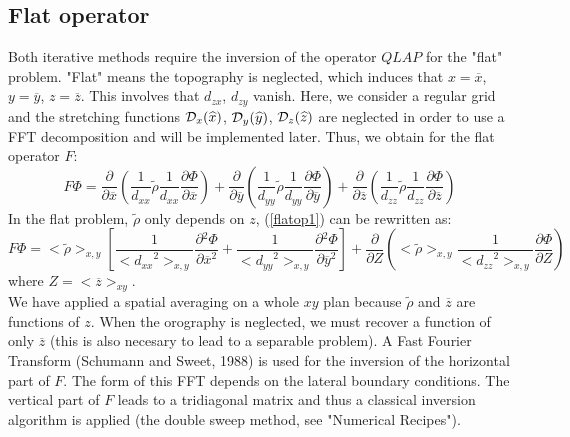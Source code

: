 \subsection{Flat operator}
\par Both iterative methods require the inversion of the operator $QLAP$ for
the "flat" problem. "Flat" means the topography is neglected, which induces
that $x=\overline{x}$, $y=\overline{y}$, $z=\overline{z}$.
This involves that $d_{zx}$, $d_{zy}$ vanish. Here, we consider a regular grid
and the stretching functions ${\cal{D}}_x (\widehat{x})$,
${\cal{D}}_y (\widehat{y})$, ${\cal{D}}_z (\widehat{z})$ are neglected
in order to use a FFT decomposition and will be implemented later. Thus, we
obtain for the flat operator $F$:\\
\begin{equation}
\label{flatop1}
F \Phi =  \frac { \partial{} } { \partial{\overline{x}} } \left(
          \dfrac{1}{d_{xx}} \tilde{\rho} \dfrac{1}{d_{xx}}
          \frac { \partial{\Phi} } { \partial{\overline{x}} } \right)
+          \frac { \partial{} } { \partial{\overline{y}} } \left(
          \dfrac{1}{d_{yy}} \tilde{\rho} \dfrac{1}{d_{yy}}
          \frac { \partial{\Phi} } { \partial{\overline{y}} } \right)
+          \frac { \partial{} } { \partial{\overline{z}} } \left(
          \dfrac{1}{d_{zz}} \tilde{\rho} \dfrac{1}{d_{zz}}
          \frac { \partial{\Phi} } { \partial{\overline{z}} } \right)
\end{equation}
In the flat problem, $\tilde{\rho}$ only depends on $z$, (\ref{flatop1})
can be rewritten as:\\
\begin{equation}
\label{flatop}
F \Phi =  < \tilde{\rho}>_{x,y}
  \left[ \dfrac{1}{<{d_{xx}}^2>_{x,y}}
         \frac { \partial{^2\Phi} } { \partial{\overline{x}^2} }
+        \dfrac{1}{<{d_{yy}}^2>_{x,y}}
         \frac { \partial{^2\Phi} } { \partial{\overline{y}^2} }
  \right]
+          \frac { \partial{} } { \partial{Z} } \left(
           <\tilde{\rho}>_{x,y} \dfrac{1} {<{d_{zz}}^2>_{x,y}}
          \frac { \partial{\Phi} } { \partial{Z} } \right)
\end{equation}
where $Z = <\overline{z}>_{xy}$.\\
We have applied a spatial averaging on a whole $xy$ plan because
$\tilde{\rho}$ and $\overline{z}$ are functions of $z$. When
the orography is neglected, we must recover a function of only $\overline{z}$ (this
is also necesary to lead to a separable problem). A Fast Fourier Transform
(Schumann and Sweet, 1988\nocite{sch88}) is used for the inversion of the
horizontal part of $F$. The form of this FFT depends on the lateral boundary
conditions. The vertical part of $F$ leads to a tridiagonal matrix and thus a
classical inversion algorithm is applied (the double sweep method, see
"Numerical Recipes").
